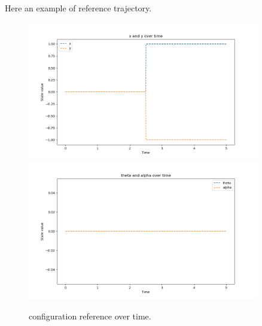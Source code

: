 Here an example of reference trajectory.

\begin{figure}[h]
  \centering
  \includegraphics[width=0.9\textwidth]{pictures/x_y ref.png}\hfill\\
  \includegraphics[width=0.9\textwidth]{pictures/theta_alpha ref.png}\hfill
  \caption{configuration reference over time.}
  \label{fig:Reference trajectory}
\end{figure}


